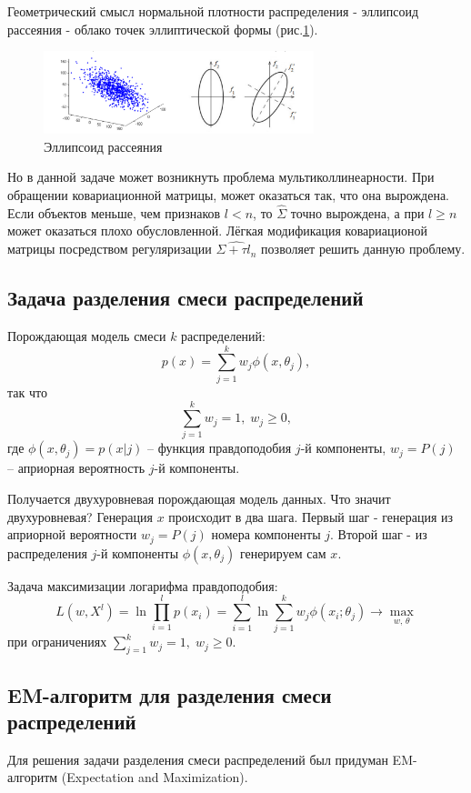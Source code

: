 Геометрический смысл нормальной плотности распределения - эллипсоид рассеяния - облако точек эллиптической формы (рис.\ref{ellips}).

\begin{figure}[h!]
    \begin{center}
        \includegraphics[width=0.7\textwidth]{chapters/bayesian/ellipsoid.png}
        \caption{Эллипсоид рассеяния}
        \label{ellips}
    \end{center}
\end{figure}

Но в данной задаче может возникнуть проблема мультиколлинеарности. При обращении ковариационной матрицы, может оказаться так, что она вырождена. Если объектов меньше, чем признаков $l < n$, то $\hat{\Sigma}$ точно вырождена, а при $l \ge n$ может оказаться плохо обусловленной.
Лёгкая модификация ковариационой матрицы посредством регуляризации $\hat{\Sigma +\tau l_n}$ позволяет решить данную проблему.

\subsection{Задача разделения смеси распределений}
Порождающая модель смеси $k$ распределений:
$$p(x) = \sum_{j=1}^k w_j \phi(x, \theta_j),$$
так что $$\sum_{j=1}^k w_j = 1, \; w_j \ge 0,$$
где $\phi(x,\theta_j) = p(x|j)$ -- функция правдоподобия $j$-й компоненты, $w_j = P(j)$ -- априорная вероятность $j$-й компоненты.

Получается двухуровневая порождающая модель данных.
Что значит двухуровневая? Генерация $x$ происходит в два шага. Первый шаг - генерация из априорной вероятности $w_j = P(j)$ номера компоненты $j$. Второй шаг - из распределения $j$-й компоненты $\phi(x,\theta_j)$ генерируем сам $x$.

Задача максимизации логарифма правдоподобия:
$$L(w, X^l) = \ln \prod_{i=1}^l p(x_i) = \sum_{i=1}^l \ln \sum_{j=1}^k w_j\phi(x_i;\theta_j) \to \max_{w,\,\theta} $$
при ограничениях $\sum_{j=1}^k w_j = 1, \; w_j \ge 0$.

\subsection{EM-алгоритм для разделения смеси распределений}
Для решения задачи разделения смеси распределений был придуман EM-алгоритм (Expectation and Maximization).

